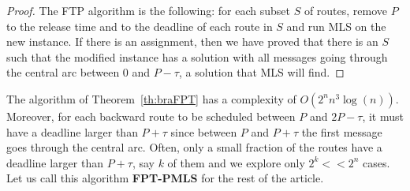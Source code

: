 \documentclass[a4paper,10pt]{article}
\begin{document}
\begin{proof}
The FTP algorithm is the following: for each subset $S$ of routes, remove $P$ to the release time and to the deadline of each route in $S$ and run MLS on the new instance. If there is an assignment, then we have proved that there is an $S$ such that the modified instance has a solution with all messages going through the central arc between $0$ and $P - \tau$, a solution that MLS will find.
\end{proof}

The algorithm of Theorem~\ref{th:braFPT} has a complexity of $O(2^nn^3\log(n))$. Moreover, for each backward route to be scheduled between $P$ and $2P-\tau$, it must have a deadline larger than $P + \tau$ since between $P$ and $P + \tau$ the first message goes through the central arc. Often, only a small fraction of the routes have a deadline larger than $P + \tau$, say $k$ of them and we explore only $2^k << 2^n$ cases. Let us call this algorithm {\bf FPT-PMLS} for the rest of the article.
\end{document}
